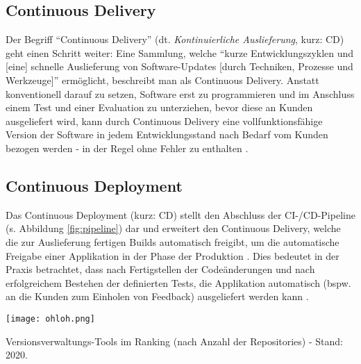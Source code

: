 \subsection{Continuous Delivery}
Der Begriff \enquote{Continuous Delivery} (dt. \textit{Kontinuierliche Auslieferung}, kurz: CD) geht einen Schritt weiter: Eine Sammlung, welche \enquote{kurze Entwicklungszyklen und [eine] schnelle Auslieferung von Software-Updates [durch Techniken, Prozesse und Werkzeuge]} \cite{Ilanrr:2017aa}
ermöglicht, beschreibt man als Continuous Delivery. Anstatt konventionell darauf zu setzen, Software erst zu programmieren und im Anschluss einem Test und einer Evaluation zu unterziehen, bevor diese an Kunden ausgeliefert wird, kann durch Continuous Delivery eine vollfunktionsfähige Version der Software
in jedem Entwicklungsstand nach Bedarf vom Kunden bezogen werden - in der Regel ohne Fehler zu enthalten \cite{Ilanrr:2017aa}.

\subsection{Continuous Deployment}
Das Continuous Deployment (kurz: CD) stellt den Abschluss der CI-/CD-Pipeline (s. Abbildung \ref{fig:pipeline}) dar und erweitert den Continuous Delivery, welche die zur Auslieferung fertigen Builds automatisch freigibt, um die automatische Freigabe einer Applikation in der Phase der Produktion \cite{RedHat:2020aa}. Dies bedeutet in der Praxis betrachtet,
dass nach Fertigstellen der Codeänderungen und nach erfolgreichem Bestehen der definierten Tests, die Applikation automatisch (bspw. an die Kunden zum Einholen von Feedback) ausgeliefert werden kann \cite{RedHat:2020aa}.

\begin{marginfigure}
    \texttt{[image: ohloh.png]}
    \caption{\label{fig:ohloh}Versionsverwaltungs-Tools im Ranking (nach Anzahl der Repositories) - Stand: 2020.}
\end{marginfigure}
